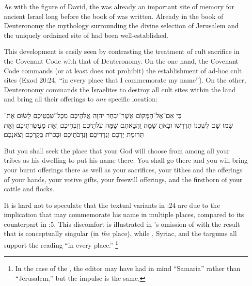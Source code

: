 As with the figure of David, the \jerusalemtemple was already an important site of memory for ancient Israel long before the book of \chronicles was written. Already in the book of Deuteronomy the mythology surrounding the divine selection of Jerusalem and the uniquely ordained site of \solomonstemple had been well-established.%
    \autocite{cogan_tarbiz1986}

This development is easily seen by contrasting the treatment of cult sacrifice in the Covenant Code with that of Deuteronomy. On the one hand, the Covenant Code commands (or at least does not prohibit) the establishment of ad-hoc cult sites (Exod 20:24,  ``in every place that I commemorate my name''). On the other, Deuteronomy commands the Israelites to destroy all cult sites within the land and bring all their offerings to \emph{one} specific location:
\begin{hebrewtext}
    כִּי אִם־אֶל־הַמָּקוֹם אֲשֶׁר־יִבְחַר יְהוָה אֱלֹהֵיכֶם מִכָּל־שִׁבְטֵיכֶם לָשׂוּם אֶת־\\שְׁמוֹ שָׁם לְשִׁכְנוֹ תִדְרְשׁוּ וּבָאתָ שָׁמָּה׃
    וַהֲבֵאתֶם שָׁמָּה עֹלֹתֵיכֶם וְזִבְחֵיכֶם וְאֵת מַעְשְׂרֹתֵיכֶם וְאֵת תְּרוּמַת יֶדְכֶם וְנִדְרֵיכֶם וְנִדְבֹתֵיכֶם וּבְכֹרֹת בְּקַרְכֶם וְצֹאנְכֶם׃
\end{hebrewtext}
\begin{translation}
    But you shall seek the place that \yahweh your God will choose from among all your tribes as his dwelling to put his name there. You shall go there
    and you will bring your burnt offerings there as well as your sacrifices, your tithes and the offerings of your hands, your votive gifts, your freewill offerings, and the firstborn of your cattle and flocks. 
\end{translation}
\noindent
It is hard not to speculate that the textual variants in :24 are due to the implication that \yahweh may commemorate his name in multiple places, compared to its counterpart in :5. This discomfort is illustrated in  \sampent's omission of  with the result that  is conceptually singular (in \emph{the} place), while \lxx, Syriac, and the targums all support the reading ``in every place.''%
    \footnote{In the case of the \sampent, the editor may have had in mind ``Samaria'' rather than ``Jerusalem,'' but the impulse is the same.}
